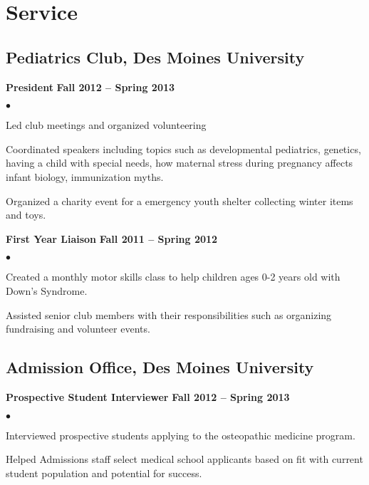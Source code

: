 \documentclass[10pt,letterpaper]{article}
\renewenvironment{itemize}{
  \begin{list}{}{
      \setlength{\leftmargin}{1.5em}
      \setlength{\itemsep}{0.25em}
      \setlength{\parskip}{0pt}
      \setlength{\parsep}{0.25em}
    }
  }{
  \end{list}
}
\newenvironment{bitemize}{
  \begin{list}{$\bullet$}{
      \setlength{\leftmargin}{1.5em}
      \setlength{\itemsep}{0.25em}
      \setlength{\parskip}{0pt}
      \setlength{\parsep}{0.25em}
    }
  }{
  \end{list}
}
\newcommand{\yearrange}[1]{\hfill \textbf{#1} \par}
\begin{document}
\section*{Service}
\subsection*{Pediatrics Club, Des Moines University}
\begin{itemize}
\item \textbf{President} \yearrange{Fall 2012 -- Spring 2013}
  \begin{bitemize}
  \item Led club meetings and organized volunteering
  \item Coordinated speakers including topics such as developmental
    pediatrics, genetics, having a child with special needs, how
    maternal stress during pregnancy affects infant biology,
    immunization myths.
  \item Organized a charity event for a emergency youth shelter
    collecting winter items and toys.
  \end{bitemize}
\item \textbf{First Year Liaison} \yearrange{Fall 2011 -- Spring 2012}
  \begin{bitemize}
  \item Created a monthly motor skills class to help children ages 0-2 years old with Down's Syndrome.
  \item Assisted senior club members with their responsibilities such as organizing fundraising and volunteer events.
  \end{bitemize}
\end{itemize}

\subsection*{Admission Office, Des Moines University}
\begin{itemize}
\item \textbf{Prospective Student Interviewer} \yearrange{Fall 2012 -- Spring 2013}
  \begin{bitemize}
  \item Interviewed prospective students applying to the osteopathic
    medicine program.
   \item Helped Admissions staff select medical school applicants based on fit with current student population and potential for success.
  \end{bitemize}
\end{itemize}
\end{document}
